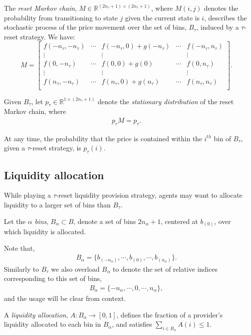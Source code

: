 \documentclass[sigconf, usenames, dvipsnames]{acmart}
\begin{document}
\begin{definition}
The \textit{reset Markov chain}, $M \in \mathbb{R}^{(2n_{\tau}+1) \times (2n_{\tau}+1)}$, where $M(i,j)$ denotes the probability from transitioning to state $j$ given the current state is $i$,  describes the stochastic process of the price movement over the set of bins, $B_{\tau}$, induced by a $\tau$-reset strategy. We have:
\[
M = 
\begin{bmatrix}
  f(-n_{\tau},-n_{\tau}) & \cdots  &f(-n_{\tau}, 0) + g(-n_{\tau}) & \cdots & f(-n_{\tau},n_{\tau}) \\
  \vdots &  & \vdots & & \vdots\\
  f(0,-n_{\tau}) & \cdots  &f(0, 0) + g(0) & \cdots & f(0,n_{\tau}) \\
  \vdots &  & \vdots & & \vdots\\
  f(n_{\tau},-n_{\tau}) & \cdots  &f\left(n_{\tau},0\right) + g(n_{\tau}) & \cdots & f(n_{\tau},n_{\tau}) \\
\end{bmatrix}.
\]
\end{definition}

\begin{definition}
Given $B_{\tau}$, let  $p_{\tau} \in \mathbb{R}^{1 \times (2n_{\tau}+1)}$ denote 
the \textit{stationary distribution} of the reset Markov chain, where
\begin{align}
    p_{\tau} M = p_{\tau}.
\end{align}
\end{definition}

At any  time, the probability that the price is contained within the $i^{th}$ bin of $B_{\tau}$, given a $\tau$-reset strategy, is $p_{\tau}(i)$.


\subsection{Liquidity allocation}

While playing a $\tau$-reset liquidity provision strategy, agents may want to allocate liquidity to a larger set of bins than $B_{\tau}$.
%
\begin{definition}
Let the \textit{$\alpha$ bins}, $B_{\alpha} \subset B$, denote a set of bins $2n_{\alpha}+1$, centered at $b_{(0)}$, over which liquidity is allocated.
\end{definition}

Note that,
\begin{align}
    B_{\alpha} = \{b_{(-n_{\alpha})}, \cdots, b_{(0)}, \cdots, b_{(n_{\alpha})}\}.
\end{align}
Similarly to $B_{\tau}$ we also overload $B_{\alpha}$ to denote the set of relative indices corresponding to this set of bins,
\begin{align}
    B_{\alpha} = \{-n_{\alpha}, \cdots, 0, \cdots, n_{\alpha}\},
\end{align}
and the usage will be clear from context.
%
\begin{definition}
A \textit{liquidity allocation}, $A \colon B_{\alpha} \to [0,1]$, defines the fraction of a provider's liquidity allocated to each bin in $B_\alpha$, and satisfies $\sum_{i \in B_{\alpha}} A(i) \leq 1$.
\end{definition}
\end{document}
